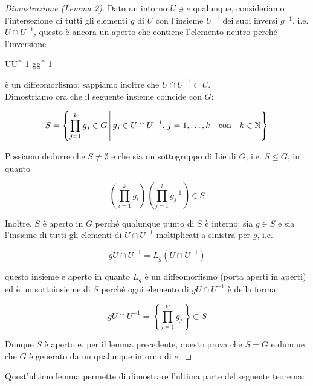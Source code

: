 \begin{proof}[Dimostrazione (Lemma 2)]
	Dato un intorno $ U \ni e $ qualunque, consideriamo l'intersezione di tutti gli elementi $ g $ di $ U $ con l'insieme $ U^{-1} $ dei suoi inversi $ g^{-1} $, i.e. $ U \cap U^{-1} $,  questo è ancora un aperto che contiene l'elemento neutro perché l'inversione
	
	{U}{U^{-1}}%
	{g}{g^{-1}}
	
	è un diffeomorfismo; sappiamo inoltre che $ U \cap U^{-1} \subset U $.\\
	Dimostriamo ora che il seguente insieme coincide con $ G $:
	
	\begin{equation}
		S = \left\{ \prod_{j=1}^{k} g_{j} \in G \st g_{j} \in U \cap U^{-1}, \, j=1,\dots,k \qq{con} k \in \N \right\}
	\end{equation}
	
	Possiamo dedurre che $ S \neq \emptyset $ e che sia un sottogruppo di Lie di $ G $, i.e. $ S \leqslant G $, in quanto
	
	\begin{equation}
		\left( \prod_{i=1}^{k} g_{i} \right) \left( \prod_{j=1}^{l} g_{j}^{-1} \right) \in S
	\end{equation}
	
	Inoltre, $ S $ è aperto in $ G $ perché qualunque punto di $ S $ è interno: sia $ g \in S $ e sia l'insieme di tutti gli elementi di $ U \cap U^{-1} $ moltiplicati a sinistra per $ g $, i.e.
	
	\begin{equation}
		g U \cap U^{-1} = L_{g}(U \cap U^{-1})
	\end{equation}
	
	questo insieme è aperto in quanto $ L_{g} $ è un diffeomorfismo (porta aperti in aperti) ed è un sottoinsieme di $ S $ perché ogni elemento di $ g U \cap U^{-1} $ è della forma
	
	\begin{equation}
		g U \cap U^{-1} = \left\{ \prod_{j=1}^{k'} g_{j} \right\} \subset S
	\end{equation}
	
	Dunque $ S $ è aperto e, per il lemma precedente, questo prova che $ S = G $ e dunque che $ G $ è generato da un qualunque intorno di $ e $.
\end{proof}

Quest'ultimo lemma permette di dimostrare l'ultima parte del seguente teorema:

